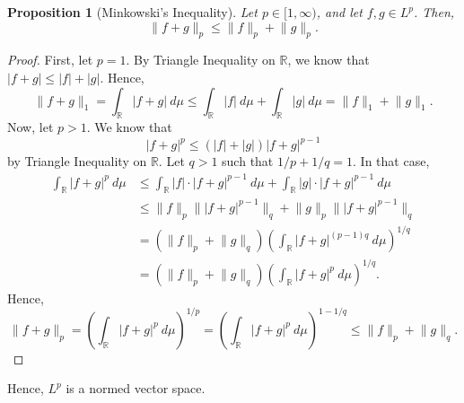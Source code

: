 \documentclass[a4paper, openany]{memoir}
\theoremstyle{definition}
\theoremstyle{plain}
\newtheorem{proposition}[definition]{Proposition}
\begin{document}
    \begin{proposition}[Minkowski's Inequality]
        Let $p \in [1, \infty)$, and let $f, g \in L^p$. Then,
        \[\lVert f  + g \rVert_p \leq \lVert f \rVert_p + \lVert g \rVert_p.\]
    \end{proposition}
    \begin{proof}
        First, let $p = 1$. By Triangle Inequality on $\mathbb{R}$, we know that $|f + g| \leq |f| + |g|$. Hence,
        \[\lVert f + g \rVert_1 = \int_{\mathbb{R}} |f + g| \ d\mu \leq \int_{\mathbb{R}} |f| \ d\mu + \int_{\mathbb{R}} |g| \ d\mu = \lVert f \rVert_1 + \lVert g \rVert_1.\]
        Now, let $p > 1$. We know that
        \[|f + g|^p \leq (|f| + |g|)|f + g|^{p-1}\]
        by Triangle Inequality on $\mathbb{R}$. Let $q > 1$ such that $1/p + 1/q = 1$. In that case,
        \begin{align*}
            \int_{\mathbb{R}} |f + g|^p \ d\mu &\leq \int_{\mathbb{R}} |f| \cdot |f + g|^{p-1} \ d\mu + \int_{\mathbb{R}} |g| \cdot |f + g|^{p - 1} \ d\mu \\
            &\leq \lVert f \rVert_p \lVert |f + g|^{p-1} \rVert_q + \lVert g \rVert_p \lVert |f + g|^{p-1} \rVert_q \\
            &= (\lVert f \rVert_p + \lVert g \rVert_q) \left(\int_{\mathbb{R}} |f + g|^{(p-1)q} \ d\mu \right)^{1/q} \\
            &= (\lVert f \rVert_p + \lVert g \rVert_q) \left(\int_{\mathbb{R}} |f + g|^p \ d\mu \right)^{1/q}.
        \end{align*}
        Hence,
        \[\lVert f + g \rVert_p = \left(\int_{\mathbb{R}} |f + g|^p \ d\mu \right)^{1/p} = \left(\int_{\mathbb{R}} |f + g|^p \ d\mu\right)^{1 - 1/q} \leq \lVert f \rVert_p + \lVert g \rVert_q.\]
    \end{proof}
    \noindent Hence, $L^p$ is a normed vector space. 
\end{document}
